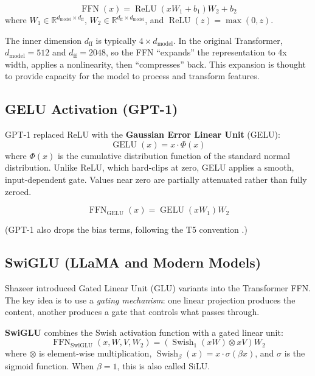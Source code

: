 \documentclass[11pt,a4paper]{article}
\newcommand{\R}{\mathbb{R}}
\newcommand{\ReLU}{\operatorname{ReLU}}
\newcommand{\GELU}{\operatorname{GELU}}
\newcommand{\Swish}{\operatorname{Swish}}
\newcommand{\SwiGLU}{\operatorname{SwiGLU}}
\newcommand{\FFN}{\operatorname{FFN}}
\newcommand{\dmodel}{d_{\text{model}}}
\newcommand{\dff}{d_{\text{ff}}}
\begin{document}
\begin{equation}
  \FFN(x) = \ReLU(x W_1 + b_1) W_2 + b_2
  \label{eq:ffn-relu}
\end{equation}
where $W_1 \in \R^{\dmodel \times \dff}$, $W_2 \in \R^{\dff \times \dmodel}$, and
$\ReLU(z) = \max(0, z)$.

The inner dimension $\dff$ is typically $4 \times \dmodel$. In the original Transformer,
$\dmodel = 512$ and $\dff = 2048$, so the FFN ``expands'' the representation to 4x width,
applies a nonlinearity, then ``compresses'' back. This expansion is thought to provide
capacity for the model to process and transform features.

\subsection{GELU Activation (GPT-1)}

GPT-1 \cite{radford2018} replaced ReLU with the \textbf{Gaussian Error Linear Unit}
(GELU):
\begin{equation}
  \GELU(x) = x \cdot \Phi(x)
\end{equation}
where $\Phi(x)$ is the cumulative distribution function of the standard normal
distribution. Unlike ReLU, which hard-clips at zero, GELU applies a smooth,
input-dependent gate. Values near zero are partially attenuated rather than fully zeroed.

\begin{equation}
  \FFN_{\text{GELU}}(x) = \GELU(x W_1) W_2
  \label{eq:ffn-gelu}
\end{equation}

(GPT-1 also drops the bias terms, following the T5 convention \cite{shazeer2020}.)

\subsection{SwiGLU (LLaMA and Modern Models)}

Shazeer \cite{shazeer2020} introduced Gated Linear Unit (GLU) variants into the
Transformer FFN. The key idea is to use a \emph{gating mechanism}: one linear projection
produces the content, another produces a gate that controls what passes through.

\textbf{SwiGLU} combines the Swish activation function with a gated linear unit:
\begin{equation}
  \FFN_{\SwiGLU}(x, W, V, W_2) = \left(\Swish_1(xW) \otimes xV \right) W_2
  \label{eq:ffn-swiglu}
\end{equation}
where $\otimes$ is element-wise multiplication, $\Swish_\beta(x) = x \cdot \sigma(\beta x)$,
and $\sigma$ is the sigmoid function. When $\beta = 1$, this is also called SiLU.
\end{document}
